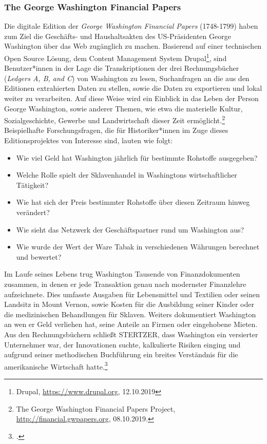\documentclass[12pt,a4paper]{article}
\begin{document}
\subsubsection{The George Washington Financial Papers}
Die digitale Edition der \textit{George Washington Financial Papers} (1748-1799) haben zum Ziel die Geschäfts- und Haushaltsakten des US-Präsidenten George Washington über das Web zugänglich zu machen. Basierend auf einer technischen Open Source Lösung, dem Content Management System Drupal\footnote{Drupal, \protect\url{https://www.drupal.org}, 12.10.2019}, sind Benutzer*innen in der Lage die Transkriptionen der drei Rechnungsbücher (\textit{Ledgers A, B, and C}) von Washington zu lesen, Suchanfragen an die aus den Editionen extrahierten Daten zu stellen, sowie die Daten zu exportieren und lokal weiter zu verarbeiten. Auf diese Weise wird ein Einblick in das Leben der Person George Washington, sowie  anderer Themen, wie etwa die materielle Kultur, Sozialgeschichte, Gewerbe und Landwirtschaft dieser Zeit ermöglicht.\footnote{The George Washington Financial Papers Project, \protect\url{http://financial.gwpapers.org}, 08.10.2019.} Beispielhafte Forschungsfragen, die für Historiker*innen im Zuge dieses Editionsprojektes von Interesse sind, lauten wie folgt: 
\begin{itemize}
\item Wie viel Geld hat Washington jährlich für bestimmte Rohstoffe ausgegeben?
\item Welche Rolle spielt der Sklavenhandel in Washingtons wirtschaftlicher Tätigkeit?
\item Wie hat sich der Preis bestimmter Rohstoffe über diesen Zeitraum hinweg verändert?
\item Wie sieht das Netzwerk der Geschäftspartner rund um Washington aus?
\item Wie wurde der Wert der Ware Tabak in verschiedenen Währungen berechnet und bewertet?
\end{itemize}
Im Laufe seines Lebens trug Washington Tausende von Finanzdokumenten zusammen, in denen er jede Transaktion genau nach modernster Finanzlehre aufzeichnete. Dies umfasste Ausgaben für Lebensmittel und Textilien oder seinen Landsitz in Mount Vernon, sowie Kosten für die Ausbildung seiner Kinder oder die medizinischen Behandlungen für Sklaven. Weiters dokumentiert Washington an wen er Geld verliehen hat, seine Anteile an Firmen oder eingehobene Mieten.
Aus den Rechnungsbüchern schließt STERTZER, dass Washington ein versierter Unternehmer war, der Innovationen suchte, kalkulierte Risiken einging und aufgrund seiner methodischen Buchführung ein breites Verständnis für die amerikanische Wirtschaft hatte.\footcite[][]{stertzer2014working}
\end{document}
